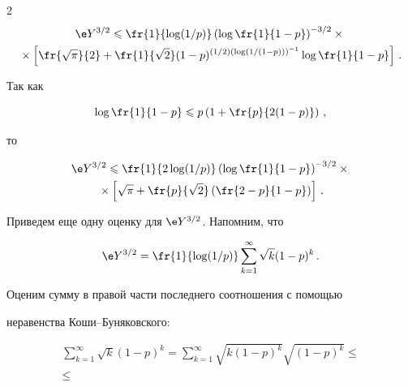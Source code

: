 \begin{multicols}{2}
\begin{multline*}
 \e Y^{3/2} \leqslant


\fr{1}{\log({1}/{p})}\left(\log\fr{1}{1-p}\right)^{-3/2}\times{}\\


{}\times


\left[\fr{\sqrt{\pi}}{2}+\fr{1}{\sqrt{2}}(1-p)^{(1/2)\left(\log (1/(1-p))\right)^{-1}}


\log\fr{1}{1-p} \right]\,.




\end{multline*}


Так как





\noindent


$$


\log\fr{1}{1-p} \leqslant  p\left(1+\fr{p}{2(1-p)}\right)\,,


$$


то


\begin{multline}


 \e Y^{3/2} \leqslant


\fr{1}{2\log({1}/{p})}\left(\log\fr{1}{1-p}\right)^{-3/2}\times{}\\


{}\times


\left[\sqrt{\pi}+\fr{p}{\sqrt{2}}


\left(\fr{2-p}{1-p}\right)\right]\,.


\label{Tu32}


\end{multline}


Приведем еще одну оценку для $\e Y^{3/2}$. Напомним, что


$$


\e Y^{3/2}=\fr{1}{\log({1}/{p})}\sum\limits_{k=1}^\infty \sqrt{k}


(1-p)^k\,.


$$


Оценим сумму в правой части последнего соотношения с помощью


неравенства Коши--Бу\-ня\-ков\-ского:


\begin{multline*}


\sum\limits_{k=1}^\infty \sqrt{k} (1-p)^k =


\sum\limits_{k=1}^\infty \sqrt{k(1-p)^k} \sqrt{(1-p)^k} \leqslant{}\\


{}\leqslant



\end{multline*}
\end{multicols}
